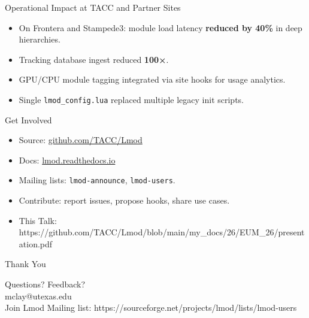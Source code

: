\documentclass[aspectratio=169]{beamer}
\begin{document}
\begin{frame}{Operational Impact at TACC and Partner Sites}
  \begin{itemize}
    \item On Frontera and Stampede3: module load latency \textbf{reduced by 40\%} in deep hierarchies.
    \item Tracking database ingest reduced \textbf{100×}.
    \item GPU/CPU module tagging integrated via site hooks for usage analytics.
    \item Single \texttt{lmod\_config.lua} replaced multiple legacy init scripts.
  \end{itemize}
\end{frame}



\begin{frame}{Get Involved}
  \begin{itemize}
    \item Source: \href{https://github.com/TACC/Lmod}{github.com/TACC/Lmod}
    \item Docs: \href{https://lmod.readthedocs.io}{lmod.readthedocs.io}
    \item Mailing lists: \texttt{lmod-announce}, \texttt{lmod-users}.
    \item Contribute: report issues, propose hooks, share use cases.
    \item This Talk: https://github.com/TACC/Lmod/blob/main/my\_docs/26/EUM\_26/presentation.pdf
  \end{itemize}
\end{frame}

\begin{frame}{Thank You}
  \begin{center}
    \Large Questions? Feedback?\\[3mm]
    \Large mclay@utexas.edu\\[3mm]
    \Large Join Lmod Mailing list: https://sourceforge.net/projects/lmod/lists/lmod-users
  \end{center}
\end{frame}
\end{document}
